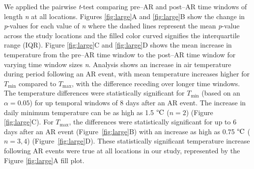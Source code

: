 \documentclass[12pts,draft]{AR_analysis_}
\begin{document}
We applied the pairwise \emph{t}-test comparing pre--AR and post--AR
time windows of length \emph{n} at all locations. Figures
\ref{fig:large}A and \ref{fig:large}B show the change in \emph{p}-values for each
value of \emph{n} where the dashed lines represent the mean
\emph{p}-value across
the study locations and the filled color curved signifies the interquartile range (IQR). 
Figure \ref{fig:large}C and \ref{fig:large}D shows the mean increase 
in temperature from the pre--AR time window to the post--AR time window 
for varying time window sizes \emph{n}. 
Analysis shows an increase in air temperature during period following an
AR event, with mean temperature increases higher for $T_{\text{min}}$
compared to $T_{\text{max}}$, with the difference receding over longer
time windows. The temperature differences were statistically significant
for $T_{\text{min}}$ (based on an $\alpha = 0.05$) for up temporal
windows of 8 days after an AR event. 
The increase in daily minimum temperature can be as high as 1.5 
$\mathrm{\degree C}$ ($n=2$) (Figure \ref{fig:large}C). 
For $T_{\text{max}}$, the differences were statistically significant for up
to 6 days after an AR event (Figure~\ref{fig:large}B) with an increase
as high as 0.75 $\mathrm{\degree C}$ ($n={3, 4}$) (Figure~\ref{fig:large}D).
These statistically significant temperature increase following AR events
were true at all locations in our study, represented
by the Figure \ref{fig:large}A fill plot. 

\end{document}
